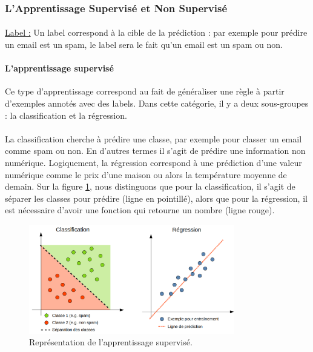 \documentclass[10pt, french, a4paper]{report}
\begin{document}
\subsubsection{L'Apprentissage Supervisé et Non Supervisé}

\paragraph{}
\underline{Label :} Un label correspond à la cible de la prédiction : par exemple pour prédire un email est un spam, le label sera le fait qu'un email est un spam ou non.

\paragraph{L'apprentissage supervisé}
Ce type d'apprentissage correspond au fait de généraliser une règle à partir d'exemples annotés avec des labels. Dans cette catégorie, il y a deux sous-groupes : la classification et la régression.

\paragraph{}
La classification cherche à prédire une classe, par exemple pour classer un email comme spam ou non. En d'autres termes il s'agit de prédire une information non numérique. Logiquement, la régression correspond à une prédiction d'une valeur numérique comme le prix d'une maison ou alors la température moyenne de demain. Sur la figure \ref{fig:apprentissage_supervise}, nous distinguons que pour la classification, il s'agit de séparer les classes pour prédire (ligne en pointillé), alors que pour la régression, il est nécessaire d'avoir une fonction qui retourne un nombre (ligne rouge).

\begin{figure}[hbt!]
    \centering
    \includegraphics[width=0.8\textwidth]{images/apprentissage_supervise.png}
    \caption{Représentation de l'apprentissage supervisé.}
    \label{fig:apprentissage_supervise}
\end{figure}
\end{document}
